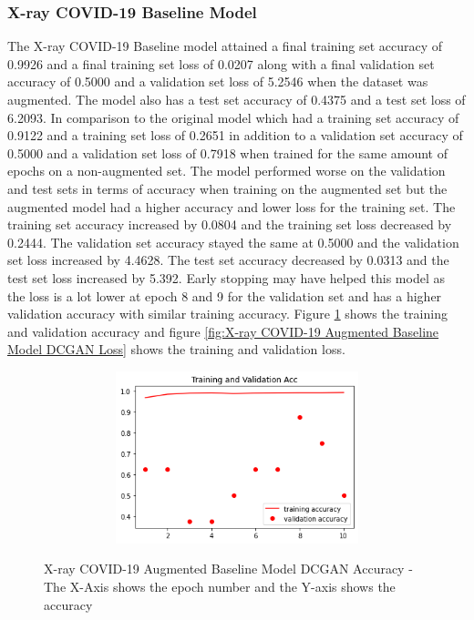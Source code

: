 \subsubsection{X-ray COVID-19 Baseline Model}
The X-ray COVID-19 Baseline model attained a final training set accuracy of 0.9926 and a final training set loss of 0.0207 along with a final validation set accuracy of 0.5000 and a validation set loss of 5.2546 when the dataset was augmented.  The model also has a test set accuracy of 0.4375 and a test set loss of 6.2093.  In comparison to the original model which had a training set accuracy of 0.9122 and a training set loss of 0.2651 in addition to a validation set accuracy of 0.5000 and a validation set loss of 0.7918 when trained for the same amount of epochs on a non-augmented set.  The model performed worse on the validation and test sets in terms of accuracy when training on the augmented set but the augmented model had a higher accuracy and lower loss for the training set.  The training set accuracy increased by 0.0804 and the training set loss decreased by 0.2444. The validation set accuracy stayed the same at 0.5000 and the validation set loss increased by 4.4628.  The test set accuracy decreased by 0.0313 and the test set loss increased by 5.392.  Early stopping may have helped this model as the loss is a lot lower at epoch 8 and 9 for the validation set and has a higher validation accuracy with similar training accuracy.  Figure \ref{fig:X-ray COVID-19 Augmented Baseline Model DCGAN Accuracy} shows the training and validation accuracy and figure \ref{fig:X-ray COVID-19 Augmented Baseline Model DCGAN Loss} shows the training and validation loss.
 \begin{figure}[H]
    \centering    \includegraphics[width=1\textwidth,height=5cm,keepaspectratio]{Images/X-ray COVID-19 dataset CNN Train and Val Acc Augmented DCGAN.png}\\
    \caption{X-ray COVID-19 Augmented Baseline Model DCGAN Accuracy - The X-Axis shows the epoch number and the Y-axis shows the accuracy}
    \label{fig:X-ray COVID-19 Augmented Baseline Model DCGAN Accuracy}
\end{figure}

